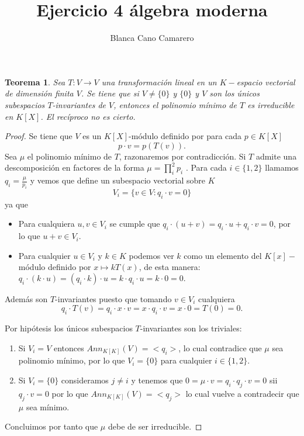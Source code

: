 \documentclass{article}
\title{Ejercicio 4 álgebra moderna}
\author{Blanca Cano Camarero}
\newtheorem*{teorema*}{Teorema}
\begin{document}
\maketitle

\begin{teorema*}
    Sea $T:V \longrightarrow V$ una transformación lineal en un $K-$espacio vectorial de dimensión finita $V$.
    Se tiene que si $V \neq \{0\}$ y $\{0\}$ y $V$ son los únicos 
    subespacios $T$-invariantes de $V$, entonces el polinomio mínimo de $T$ es irreducible en $K[X]$. El recíproco no es cierto. 
\end{teorema*}   

\begin{proof}

    Se tiene que $V$ es un $K[X]$-módulo definido por para cada
    $p \in K[X]$
    \begin{equation*}
        p \cdot v = p (T(v)).
    \end{equation*}
   Sea $\mu$ el polinomio mínimo de $T$, razonaremos por contradicción. 
   Si $T$ admite una descomposición en factores de la forma
   $\mu = \prod^2_i p_i$ . 
   Para cada $i \in \{1, 2\}$ llamamos  $q_i = \frac{\mu}{p_i}$ y vemos que define un subespacio vectorial sobre $K$
   \begin{equation*}
       V_i = \{ v \in V : q_i \cdot v = 0\}
   \end{equation*}
   ya que
   \begin{itemize}
       \item Para cualquiera $u,v \in V_i$ se cumple que 
       $q_i \cdot (u + v) = q_i \cdot u +q_i \cdot v = 0$,
        por lo que $u+v  \in V_i$. 
        \item Para cualquier $u \in V_i$ y $k \in K$ podemos ver $k$ como un elemento del  $K[x]-$módulo definido por 
        $x \mapsto kT(x)$, de esta manera: 
        $q_i \cdot (k \cdot u) = (q_i \cdot k )\cdot u = k \cdot q_i \cdot u =  k \cdot 0 = 0.$
   \end{itemize}
    Además son $T$-invariantes puesto que tomando  
    $v \in V_i$ cualquiera 
   \begin{equation*}
       q_i \cdot T(v) 
       = q_i \cdot x \cdot  v 
       = x \cdot q_i \cdot v 
       = x \cdot 0
       = T(0)
       = 0. 
   \end{equation*}

Por hipótesis los únicos subespacios $T$-invariantes son los triviales:

\begin{enumerate}
    \item Si $V_i = V$ entonces $Ann_{K[K]}(V)= <q_i>$, lo cual contradice que $\mu$ sea polinomio mínimo, por lo que 
    $V_i=\{0\}$ para cualquier $i \in \{1, 2\}$. 
    \item Si $V_i=\{0\}$ consideramos $j \neq i$ y tenemos que 
    $0 = \mu \cdot v =  q_i \cdot q_j \cdot v = 0$ sii $q_j \cdot v = 0$ por lo que $Ann_{K[K]}(V)= <q_j>$ lo cual vuelve a contradecir que $\mu$ sea mínimo.
\end{enumerate}

Concluimos por tanto que $\mu$ debe de ser irreducible. 
\end{proof}
\end{document}
